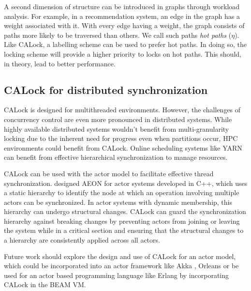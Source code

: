 A second dimension of structure can be introduced in graphs through workload analysis. For example, in a recommendation system, an edge in the graph has a weight associated with it. With every edge having a weight, the graph consists of paths more likely to be traversed than others. We call such paths \emph{hot paths} ($\eta$). Like CALock, a labelling scheme can be used to prefer hot paths. In doing so, the locking scheme will provide a higher priority to locks on hot paths. This should, in theory, lead to better performance. 



\subsection{CALock for distributed synchronization}

CALock is designed for multithreaded environments. However, the challenges of concurrency control are even more pronounced in distributed systems. While highly available distributed systems wouldn't benefit from multi-granularity locking due to the inherent need for progress even when partitions occur, HPC environments could benefit from CALock. Online scheduling systems like YARN \cite{DBLP:conf/cloud/VavilapalliMDAKEGLSSSCORRB13} can benefit from effective hierarchical synchronization to manage resources.

CALock can be used with the actor model to facilitate effective thread synchronization. \citet{sang_scalable_2020} designed AEON for actor systems developed in C++, which uses a static hierarchy to identify the node at which an operation involving multiple actors can be synchronized. In actor systems with dynamic membership, this hierarchy can undergo structural changes. CALock can guard the synchronization hierarchy against breaking changes by preventing actors from joining or leaving the system while in a critical section and ensuring that the structural changes to a hierarchy are consistently applied across all actors.

Future work should explore the design and use of CALock for an actor model, which could be incorporated into an actor framework like Akka \cite{10.5555/2663429}, Orleans \cite{10.1145/2038916.2038932} or be used for an actor based programming language like Erlang \cite{armstrong1991erlang} by incorporating CALock in the BEAM VM.




